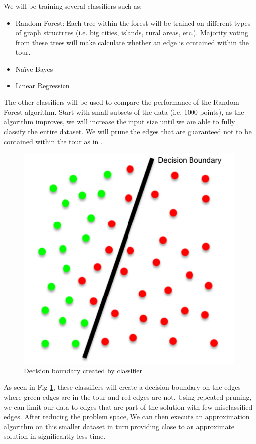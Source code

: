 \documentclass[]{UCD_CS_FYP_Report}
\begin{document}
We will be training several classifiers such as:
\begin{itemize}
    \item Random Forest: Each tree within the forest will be trained on different types of graph structures (i.e. big cities, islands, rural areas, etc.). Majority voting from these trees will make calculate whether an edge is contained within the tour. 
    \item Naïve Bayes
    \item Linear Regression
\end{itemize}

The other classifiers will be used to compare the performance of the Random Forest algorithm.
Start with small subsets of the data (i.e. 1000 points), as the algorithm improves, we will increase the input size until we are able to fully classify the entire dataset.
We will prune the edges that are guaranteed not to be contained within the tour as in \cite{iAAA}. 

\newpage
\begin{figure}[h]
    \centering
  \includegraphics[width=0.5\linewidth]{Figures/Prune.pdf}
  \caption{Decision boundary created by classifier}
  \label{fig:Prune}
\end{figure}
As seen in Fig \ref{fig:Prune}, these classifiers will create a decision boundary on the edges where green edges are in the tour and red edges are not. Using repeated pruning, we can limit our data to edges that are part of the solution with few misclassified edges. After reducing the problem space, We can then execute an approximation algorithm on this smaller dataset in turn providing close to an approximate solution in significantly less time.


\end{document}
